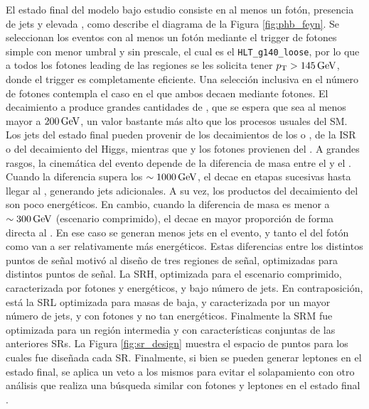 El estado final del modelo bajo estudio consiste en al menos un fotón, presencia de jets y elevada \met, como describe el diagrama de la Figura \ref{fig:phb_feyn}. 
Se seleccionan los eventos con al menos un fotón mediante 
el trigger de fotones simple con menor umbral y sin prescale, el cual es el \texttt{HLT\_g140\_loose}, por lo que a todos los fotones leading de las regiones se les solicita tener $p_{\text{T}}>145\,\text{GeV}$, donde el trigger es completamente eficiente. Una selección inclusiva en el número de fotones contempla el caso en el que ambos \ninoone decaen mediante fotones. El decaimiento a \gravino produce grandes cantidades de \met, que se espera que sea al menos mayor a $200\,\text{GeV}$, un valor bastante más alto que los procesos usuales del SM. 
Los jets del estado final pueden provenir de los decaimientos de los \chinoonepm o \ninotwo, de la ISR o del decaimiento del Higgs, mientras que \met y los fotones provienen del \ninoone.
A grandes rasgos, la cinemática del evento depende de la diferencia de masa entre el \gluino y el \ninoone. 
Cuando la diferencia supera los $\sim 1000\,\text{GeV}$, el \gluino decae en etapas sucesivas hasta llegar al \ninoone, generando jets adicionales. A su vez, los productos del decaimiento del \ninoone son poco energéticos. En cambio, cuando la diferencia de masa es menor a $\sim 300\,\text{GeV}$ (escenario comprimido), el \gluino decae en mayor proporción de forma directa al \ninoone. En ese caso se generan menos jets en el evento, y tanto el \pt del fotón como \met van a ser relativamente más energéticos.
Estas diferencias entre los distintos puntos de señal motivó al diseño de tres regiones de señal, optimizadas para distintos puntos de señal. La SRH, optimizada para el escenario comprimido, caracterizada por fotones y \met energéticos, y bajo número de jets. En contraposición, está la SRL optimizada para masas de \ninoone baja, y caracterizada por un mayor número de jets, y con fotones y \met no tan energéticos. Finalmente la SRM fue optimizada para un región intermedia y con características conjuntas de las anteriores SRs. La Figura \ref{fig:sr_design}  muestra el espacio de puntos para los cuales fue diseñada cada SR. Finalmente, si bien se pueden generar leptones en el estado final, se aplica un veto a los mismos para evitar el solapamiento con otro análisis que realiza una búsqueda similar con fotones y leptones en el estado final \cite{diph_8TeV}.

